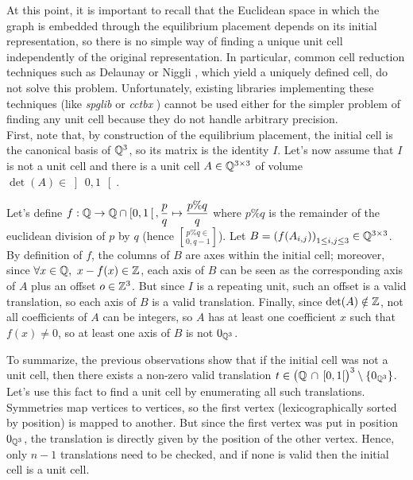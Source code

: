 \documentclass[main.tex]{subfiles}
\begin{document}
At this point, it is important to recall that the Euclidean space in which the graph is embedded through the equilibrium placement depends on its initial representation, so there is no simple way of finding a unique unit cell independently of the original representation. In particular, common cell reduction techniques such as Delaunay \autocite{Delaunay} or Niggli \autocite{Niggli, reducedCell}, which yield a uniquely defined cell, do not solve this problem. Unfortunately, existing libraries implementing these techniques (like \textit{spglib} \autocite{spglib} or \textit{cctbx} \autocite{cctbx}) cannot be used either for the simpler problem of finding any unit cell because they do not handle arbitrary precision.
\\

First, note that, by construction of the equilibrium placement, the initial cell is the canonical basis of $\mathbb{Q}^3$, so its matrix is the identity $I$. Let's now assume that $I$ is not a unit cell and there is a unit cell $A\in\mathbb{Q}^{3\times3}$ of volume $\det(A)\in\left]\,0,1\,\right[$.

Let's define $f:\mathbb{Q}\to\mathbb{Q}\cap\left[0,1\,\right[, \displaystyle\frac pq\mapsto\frac{p\%q}q$ where $p\%q$ is the remainder of the euclidean division of $p$ by $q$ (hence $p\%q\in\brack{0,q-1}$). Let $B = \left(f(A_{i,j})\right)_{1\le i,j\le3}\in\mathbb{Q}^{3\times3}$. By definition of $f$, the columns of $B$ are axes within the initial cell; moreover, since $\forall x\in\mathbb{Q},\ x-f(x)\in\mathbb{Z}$, each axis of $B$ can be seen as the corresponding axis of $A$ plus an offset $o\in\mathbb{Z}^3$. But since $I$ is a repeating unit, such an offset is a valid translation, so each axis of $B$ is a valid translation. Finally, since $\det(A)\notin\mathbb{Z}$, not all coefficients of $A$ can be integers, so $A$ has at least one coefficient $x$ such that $f(x)\neq0$, so at least one axis of $B$ is not $0_{\mathbb{Q}^3}$.

To summarize, the previous observations show that if the initial cell was not a unit cell, then there exists a non-zero valid translation $t\in\big(\mathbb{Q}\,\cap\,[0,1[\big)^3\setminus\{0_{\mathbb{Q}^3}\}$.\\

Let's use this fact to find a unit cell by enumerating all such translations. Symmetries map vertices to vertices, so the first vertex (lexicographically sorted by position) is mapped to another. But since the first vertex was put in position $0_{\mathbb{Q}^3}$, the translation is directly given by the position of the other vertex. Hence, only $n-1$ translations need to be checked, and if none is valid then the initial cell is a unit cell.
\end{document}

